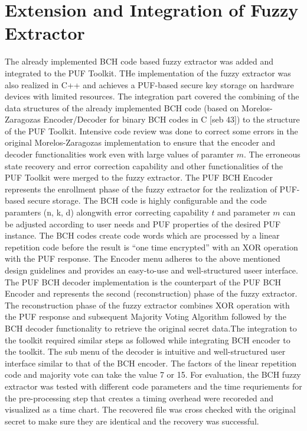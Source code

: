 \section{Extension and Integration of Fuzzy Extractor}
The already implemented BCH code based fuzzy extractor was added and integrated to the PUF Toolkit. THe implementation of the fuzzy extractor was also realized in C++ and achieves a PUF-based secure key storage on hardware devices with limited resources. The integration part covered the combining of the data structures of the already implemented BCH code (based on Morelos-Zaragozas Encoder/Decoder for binary BCH codes in C [seb 43]) to the structure of the PUF Toolkit. Intensive code review was
done to correct some errors in the original Morelos-Zaragozas implementation to ensure that the encoder and decoder functionalities work even with large values of paramter $m$. The erroneous state recovery and error correction capability and other functionalities of the PUF Toolkit were merged to the fuzzy extractor. The PUF BCH Encoder represents the enrollment phase of the fuzzy extractor for the realization of PUF-based secure storage. The BCH code is highly configurable and the code
paramters (n, k, d) alongwith error correcting capability $t$ and parameter $m$ can be adjusted according to user needs and PUF properties of the desired PUF instance. The BCH codes create code words which are processed by a linear repetition code before the result is ``one time encrypted'' with an XOR operation with the PUF response. The Encoder menu adheres to the above mentioned design guidelines and provides an easy-to-use and well-structured useer interface. The PUF BCH decoder
implementation is the counterpart of the PUF BCH Encoder and represents the second (reconstruction) phase of the fuzzy extractor. The reconstruction phase of the fuzzy extractor combines XOR operation with the PUF response and subsequent Majority Voting Algorithm followed by the BCH decoder functionality to retrieve the original secret data.The integration to the toolkit required similar steps as followed while integrating BCH encoder to the toolkit. The sub menu of the
decoder is intuitive and well-structured user interface similar to that of the BCH encoder. The factors of the linear repetition code and majority vote can take the value 7 or 15. For evaluation, the BCH fuzzy extractor was tested with different code parameters and the time requriements for the pre-processing step that creates a timing overhead were recoreded and visualized as a time chart. The recovered file was cross checked with the original secret to make sure they are
identical and the recovery was successful.\\

